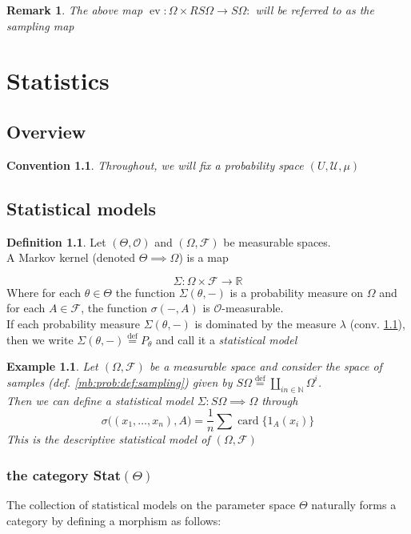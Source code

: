 \documentclass{book}
\theoremstyle{plain}
\newtheorem{convention}[corollary]{Convention}
\newtheorem{example}[corollary]{Example}
\newtheorem{remark}[corollary]{Remark}
\theoremstyle{definition}
\newtheorem{definition}[corollary]{Definition}
\DeclareMathOperator{\card}{card}
\renewcommand{\d}[1]{\mathbb{#1}}
\newcommand{\define}{\stackrel{\operatorname{def}}{=}}
\DeclareMathOperator{\ev}{ev}
\newcommand{\mor}{\longrightarrow}
\renewcommand{\r}[1]{\mathcal{#1}}
\renewcommand{\r}[1]{\mathcal{#1}}
\begin{document}
\begin{remark}\label{rem:prob_sampling-map}
The above map $\ev: \Omega\times RS\Omega\mor S\Omega: $
will be referred to as the sampling map
\end{remark}
\chapter{Statistics}


\section{Overview}
\begin{convention}\label{conv:stats_univ-prob}
Throughout, we will fix a probability space $(U,\r{U},\mu)$
\end{convention}
\section{Statistical models}
\begin{definition}
Let $(\Theta, \r{O})$ and $(\Omega,\r{F})$ be measurable spaces.\\
A Markov kernel (denoted $\Theta\implies \Omega$) is a map

\[
\Sigma: \Omega \times \r{F}\mor \d{R}
\]
Where for each $\theta \in \Theta$ the function $\Sigma(\theta,-)$ is a probability measure on $\Omega$ and for each $A \in\r{F}$, the function $\sigma(-,A)$ is $\r{O}$-measurable.\\
If each probability measure $\Sigma(\theta,-)$ is dominated by the measure $\lambda$ (conv. \ref{conv:stats_univ-prob}), then we write $\Sigma(\theta,-)\define P_\theta$ and call it a \emph{statistical model}
\end{definition}

\begin{example}
Let $(\Omega, \r{F})$ be a measurable space and consider the  space  of samples (def. \ref{mb:prob:def:sampling}) given by $S\Omega\define \coprod_{in \in\d{N}}\Omega^i$.\\
Then we can define a statistical model $\Sigma: S\Omega \implies \Omega$ through
\[
\sigma\big((x_1,\ldots, x_n), A\big)=\frac{1}{n}\sum \card\big\{1_{A}(x_i)\big\}
\]
This is the descriptive statistical model of $(\Omega, \r{F})$\end{example}
\subsection{the category Stat$(\Theta)$}
The collection of statistical models on  the parameter space $\Theta$ naturally forms a category by defining a morphism as follows:
\end{document}
